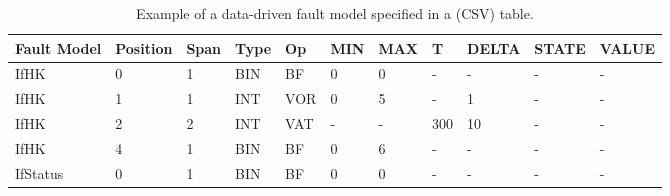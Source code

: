 \begin{table}[h]
\begin{center}
\small
\begin{tabular}{|p{1cm}|p{1.6cm}|p{1cm}|p{1cm}|p{1cm}|p{1cm}|p{1cm}|p{1.6cm}|p{1cm}|p{1cm}|p{1cm}|}
\hline
\textbf{Fault Model}&\textbf{Position}&\textbf{Span}&\textbf{Type}&\textbf{Op}&\textbf{MIN}&\textbf{MAX}&\textbf{T}&\textbf{DELTA}&\textbf{STATE}&\textbf{VALUE}\\
\hline
IfHK&0&1&BIN&BF&0&0&-&-&-&-\\
IfHK&1&1&INT&VOR&0&5&-&1&-&-\\
IfHK&2&2&INT&VAT&-&-&300&10&-&-\\
IfHK&4&1&BIN&BF&0&6&-&-&-&-\\
\hline
IfStatus&0&1&BIN&BF&0&0&-&-&-&-\\
\hline
\end{tabular}
\end{center}
\caption{Example of a data-driven fault model specified in a (CSV) table.}
\label{table:faultModel:example}
\end{table}%